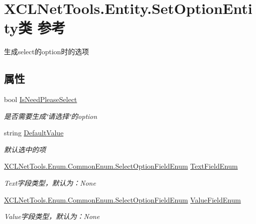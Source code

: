\hypertarget{class_x_c_l_net_tools_1_1_entity_1_1_set_option_entity}{}\section{X\+C\+L\+Net\+Tools.\+Entity.\+Set\+Option\+Entity类 参考}
\label{class_x_c_l_net_tools_1_1_entity_1_1_set_option_entity}


生成select的option时的选项  


\subsection*{属性}
\begin{DoxyCompactItemize}
\item 
bool \hyperlink{class_x_c_l_net_tools_1_1_entity_1_1_set_option_entity_a22c7d14f09183bb9124fa9219663be6c}{Is\+Need\+Please\+Select}
\begin{DoxyCompactList}\small\item\em 是否需要生成\char`\"{}请选择\char`\"{}的option \end{DoxyCompactList}\item 
string \hyperlink{class_x_c_l_net_tools_1_1_entity_1_1_set_option_entity_a504fe6ad96f52cb7eb9f8a4e64e07723}{Default\+Value}
\begin{DoxyCompactList}\small\item\em 默认选中的项 \end{DoxyCompactList}\item 
\hyperlink{class_x_c_l_net_tools_1_1_enum_1_1_common_enum_afe1323cff3b78e93907bf636697b2b59}{X\+C\+L\+Net\+Tools.\+Enum.\+Common\+Enum.\+Select\+Option\+Field\+Enum} \hyperlink{class_x_c_l_net_tools_1_1_entity_1_1_set_option_entity_a73ab171debc846e282a87565cf7baf96}{Text\+Field\+Enum}
\begin{DoxyCompactList}\small\item\em Text字段类型，默认为：\+None \end{DoxyCompactList}\item 
\hyperlink{class_x_c_l_net_tools_1_1_enum_1_1_common_enum_afe1323cff3b78e93907bf636697b2b59}{X\+C\+L\+Net\+Tools.\+Enum.\+Common\+Enum.\+Select\+Option\+Field\+Enum} \hyperlink{class_x_c_l_net_tools_1_1_entity_1_1_set_option_entity_a3f5eebe69ef0bc0e2c184f9d8d65fbaf}{Value\+Field\+Enum}
\begin{DoxyCompactList}\small\item\em Value字段类型，默认为：\+None \end{DoxyCompactList}\end{DoxyCompactItemize}


